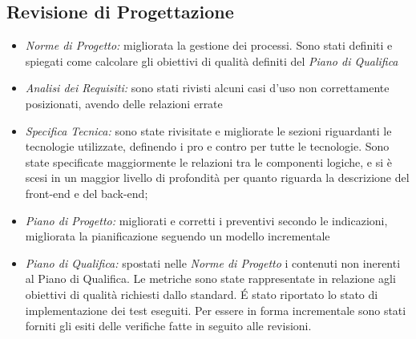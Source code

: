 \subsection{Revisione di Progettazione}
\begin{itemize}
\item \emph{Norme di Progetto: }migliorata la gestione dei processi. Sono stati definiti e spiegati come calcolare gli obiettivi di qualità definiti del \emph{Piano di Qualifica}

\item \emph{Analisi dei Requisiti: }sono stati rivisti alcuni casi d'uso non correttamente posizionati, avendo delle relazioni errate

\item \emph{Specifica Tecnica: }sono state rivisitate e migliorate le sezioni riguardanti le tecnologie utilizzate, definendo i pro e contro per tutte le tecnologie. Sono state specificate maggiormente le relazioni tra le componenti logiche, e si è scesi in un maggior livello di profondità per quanto riguarda la descrizione del front-end e del back-end;

\item \emph{Piano di Progetto: }migliorati e corretti i preventivi secondo le indicazioni, migliorata la pianificazione seguendo un modello incrementale

\item \emph{Piano di Qualifica: }spostati nelle \emph{Norme di Progetto} i contenuti non inerenti al Piano di Qualifica. Le metriche sono state rappresentate in relazione agli obiettivi di qualità richiesti dallo standard. É stato riportato lo stato di implementazione dei test eseguiti. Per essere in forma incrementale sono stati forniti gli esiti delle verifiche fatte in seguito alle revisioni.
\end{itemize}